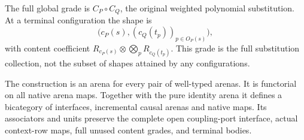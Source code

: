\documentclass[11pt]{article}
\begin{document}
The full global grade is $C_P\circ C_Q$, the original weighted polynomial substitution. At a terminal configuration the shape is
\[
 \bigl(c_P(s),(c_Q(t_p))_{p\in O_P(s)}\bigr),\tag{G}
\]
with content coefficient $R_{c_P(s)}\otimes\bigotimes_p R_{c_Q(t_p)}$. This grade is the full substitution collection, not the subset of shapes attained by any configurations.

\begin{theorem}
The construction is an arena for every pair of well-typed arenas. It is functorial on all native arena maps. Together with the pure identity arena it defines a bicategory of interfaces, incremental causal arenas and native maps. Its associators and units preserve the complete open coupling-port interface, actual context-row maps, full unused content grades, and terminal bodies.
\end{theorem}
\end{document}
